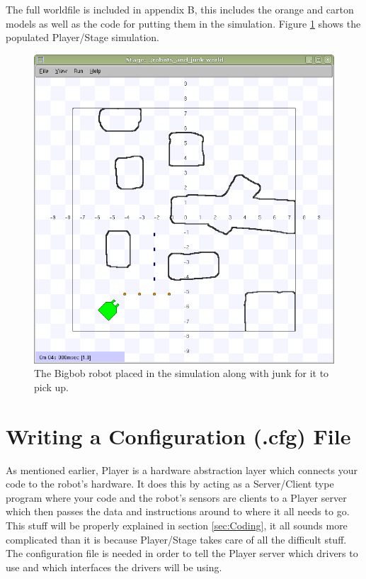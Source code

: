 \documentclass[a4paper]{report}
\newcommand{\plst}{Player/Stage\xspace}
\newcommand{\pl}{Player\xspace}
\begin{document}
The full worldfile is included in appendix B, this includes the orange and carton models as well as the code for putting them in the simulation. Figure \ref{fig:BuildingAWorld:OtherStuff:FinalRobotAndStuff} shows the populated \plst simulation.

\begin{figure}
	\centering
	\includegraphics[width=0.8\linewidth]{./pics/oranges_box/final_robot_and_stuff.png} 
	\caption{The Bigbob robot placed in the simulation along with junk for it to pick up.}
	\label{fig:BuildingAWorld:OtherStuff:FinalRobotAndStuff}
\end{figure}



\chapter{Writing a Configuration (.cfg) File} \label{sec:ConfigurationFile}

As mentioned earlier, \pl is a hardware abstraction layer which connects your code to the robot's hardware. It does this by acting as a Server/Client type program where your code and the robot's sensors are clients to a \pl server which then passes the data and instructions around to where it all needs to go. This stuff will be properly explained in section \ref{sec:Coding}, it all sounds more complicated than it is because \plst takes care of all the difficult stuff. The configuration file is needed in order to tell the \pl server which drivers to use and which interfaces the drivers will be using.
\end{document}
